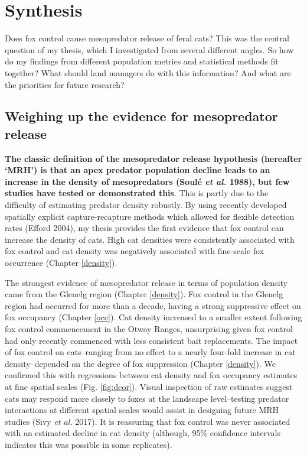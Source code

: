 \documentclass[11pt,a4paper,titlepage,twoside,openright]{style/unimelbthesis}
\begin{document}
\begin{mainmatter}
\hypertarget{synthesis}{%
\chapter{Synthesis}\label{synthesis}}

Does fox control cause mesopredator release of feral cats? This was the central question of my thesis, which I investigated from several different angles. So how do my findings from different population metrics and statistical methods fit together? What should land managers do with this information? And what are the priorities for future research?

\hypertarget{weighing-up-the-evidence-for-mesopredator-release}{%
\section{Weighing up the evidence for mesopredator release}\label{weighing-up-the-evidence-for-mesopredator-release}}

\textbf{The classic definition of the mesopredator release hypothesis (hereafter `MRH') is that an apex predator population decline leads to an increase in the density of mesopredators (Soulé \emph{et al.} 1988), but few studies have tested or demonstrated this}. This is partly due to the difficulty of estimating predator density robustly. By using recently developed spatially explicit capture-recapture methods which allowed for flexible detection rates (Efford 2004), my thesis provides the first evidence that fox control can increase the density of cats. High cat densities were consistently associated with fox control and cat density was negatively associated with fine-scale fox occurrence (Chapter \ref{density}).

The strongest evidence of mesopredator release in terms of population density came from the Glenelg region (Chapter \ref{density}). Fox control in the Glenelg region had occurred for more than a decade, having a strong suppressive effect on fox occupancy (Chapter \ref{occ}). Cat density increased to a smaller extent following fox control commencement in the Otway Ranges, unsurprising given fox control had only recently commenced with less consistent bait replacements. The impact of fox control on cats--ranging from no effect to a nearly four-fold increase in cat density--depended on the degree of fox suppression (Chapter \ref{density}). We confirmed this with regressions between cat density and fox occupancy estimates at fine spatial scales (Fig. \ref{fig:dcor}). Visual inspection of raw estimates suggest cats may respond more closely to foxes at the landscape level--testing predator interactions at different spatial scales would assist in designing future MRH studies (Sivy \emph{et al.} 2017). It is reassuring that fox control was never associated with an estimated decline in cat density (although, 95\% confidence intervals indicates this was possible in some replicates).


\end{mainmatter}
\end{document}
